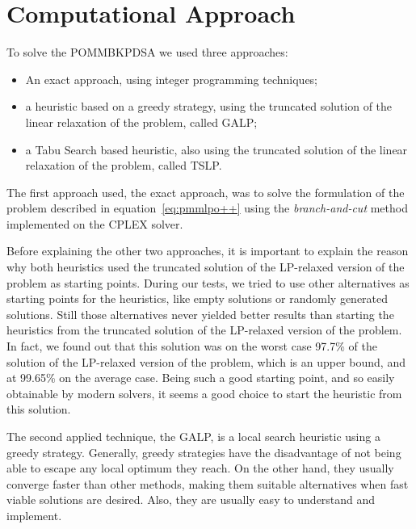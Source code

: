 \section{Computational Approach}
\label{sec:approach}

To solve the POMMBKPDSA we used three approaches:

\begin{itemize}
  \item An exact approach, using integer programming techniques;
  \item a heuristic based on a greedy strategy, using the truncated solution of the linear relaxation of the problem, called GALP;
  \item a Tabu Search based heuristic, also using the truncated solution of the linear relaxation of the problem, called TSLP.
\end{itemize}

The first approach used, the exact approach, was to solve the formulation of the problem described in 
equation~\ref{eq:pmmlpo++} using the \textit{branch-and-cut} method~\cite{padberg1991branch} implemented on the
CPLEX solver.

Before explaining the other two approaches, it is important to explain the reason why both heuristics used 
the truncated solution of the LP-relaxed version of the problem as starting points. During our tests, we tried 
to use other alternatives as starting points for the heuristics, like empty solutions or randomly generated 
solutions. Still those alternatives never yielded better results than starting the heuristics from the truncated
solution of the LP-relaxed version of the problem. In fact, we found out that this solution was on the worst case
97.7\% of the solution of the LP-relaxed version of the problem, which is an upper bound, and at 99.65\% on the average case.
Being such a good starting point, and so easily obtainable by modern solvers, it seems a good choice to start the 
heuristic from this solution.

The second applied technique, the GALP, is a local search heuristic using a greedy strategy. Generally, greedy strategies have the disadvantage 
of not being able to escape any local optimum they reach. On the other hand, they usually converge faster than other methods, 
making them suitable alternatives when fast viable solutions are desired. Also, they are usually easy to understand and implement.

